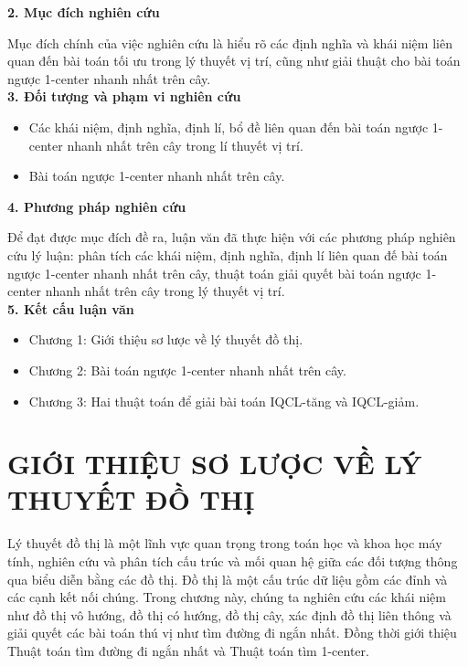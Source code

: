 \documentclass[12pt,oneside,a4paper]{bookAnh1}
\theoremstyle{plain}
\theoremstyle{nonumberplain}
\numberwithin{equation}{chapter}
\begin{document}
{\textbf{2. Mục đích nghiên cứu}

Mục đích chính của việc nghiên cứu là hiểu rõ các định nghĩa và khái niệm liên quan đến bài toán tối ưu trong lý thuyết vị trí, cũng như giải thuật cho bài toán ngược 1-center nhanh nhất trên cây.\\

\textbf{3. Đối tượng và phạm vi nghiên cứu}

 \begin{itemize}
        \item Các khái niệm, định nghĩa, định lí, bổ đề liên quan đến bài toán ngược 1-center nhanh nhất trên cây trong lí thuyết vị trí.
        \item Bài toán ngược 1-center nhanh nhất trên cây.
\end{itemize}
\textbf{4. Phương pháp nghiên cứu}

Để đạt được mục đích đề ra, luận văn đã thực hiện với các phương pháp nghiên cứu lý luận: phân tích các khái niệm, định nghĩa, định lí liên quan đế bài toán ngược 1-center nhanh nhất trên cây, thuật toán giải quyết bài toán ngược 1-center nhanh nhất trên cây trong lý thuyết vị trí.\\

\textbf{5. Kết cấu luận văn}

\begin{itemize}
        \item Chương 1: Giới thiệu sơ lược về lý thuyết đồ thị.
        \item Chương 2: Bài toán ngược 1-center nhanh nhất trên cây.
        \item Chương 3: Hai thuật toán để giải bài toán IQCL-tăng và IQCL-giảm.
    \end{itemize}
\newpage {}
\chapter{GIỚI THIỆU SƠ LƯỢC VỀ LÝ THUYẾT ĐỒ THỊ}

\hspace*{0.35cm} Lý thuyết đồ thị là một lĩnh vực quan trọng trong toán học và khoa học máy tính, nghiên cứu và phân tích cấu trúc và mối quan hệ giữa các đối tượng thông qua biểu diễn bằng các đồ thị. Đồ thị là một cấu trúc dữ liệu gồm các đỉnh và các cạnh kết nối chúng. Trong chương này, chúng ta nghiên cứu các khái niệm như đồ thị vô hướng, đồ thị có hướng, đồ thị cây, xác định đồ thị liên thông và giải quyết các bài toán thú vị như tìm đường đi ngắn nhất. Đồng thời giới thiệu Thuật toán tìm đường đi ngắn nhất và Thuật toán tìm 1-center.
}
\end{document}
